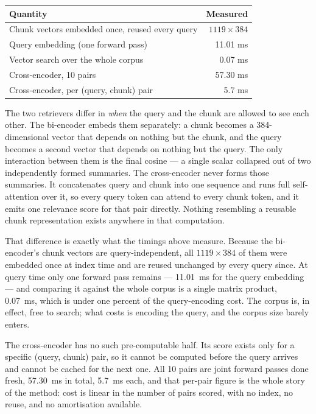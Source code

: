 \documentclass[11pt,a4paper]{article}
\begin{document}
\begin{center}\begin{tabular}{lr}\toprule
\textbf{Quantity} & \textbf{Measured} \\ \midrule
Chunk vectors embedded once, reused every query & $1119 \times 384$ \\
Query embedding (one forward pass) & 11.01 ms \\
Vector search over the whole corpus & 0.07 ms \\
Cross-encoder, 10 pairs & 57.30 ms \\
Cross-encoder, per (query, chunk) pair & 5.7 ms \\
\bottomrule\end{tabular}\end{center}
The two retrievers differ in \emph{when} the query and the chunk are allowed to
see each other. The bi-encoder embeds them separately: a chunk becomes a
384-dimensional vector that depends on nothing but the chunk, and the query
becomes a second vector that depends on nothing but the query. The only
interaction between them is the final cosine --- a single scalar collapsed out
of two independently formed summaries. The cross-encoder never forms those
summaries. It concatenates query and chunk into one sequence and runs full
self-attention over it, so every query token can attend to every chunk token,
and it emits one relevance score for that pair directly. Nothing resembling a
reusable chunk representation exists anywhere in that computation.

That difference is exactly what the timings above measure. Because the
bi-encoder's chunk vectors are query-independent, all $1119 \times 384$ of them
were embedded once at index time and are reused unchanged by every query since.
At query time only one forward pass remains --- 11.01~ms for the query
embedding --- and comparing it against the whole corpus is a single matrix
product, 0.07~ms, which is under one percent of the query-encoding cost. The
corpus is, in effect, free to search; what costs is encoding the query, and the
corpus size barely enters.

The cross-encoder has no such pre-computable half. Its score exists only for a
specific (query, chunk) pair, so it cannot be computed before the query arrives
and cannot be cached for the next one. All 10 pairs are joint forward passes
done fresh, 57.30~ms in total, 5.7~ms each, and that per-pair figure is the
whole story of the method: cost is linear in the number of pairs scored, with no
index, no reuse, and no amortisation available.
\end{document}
